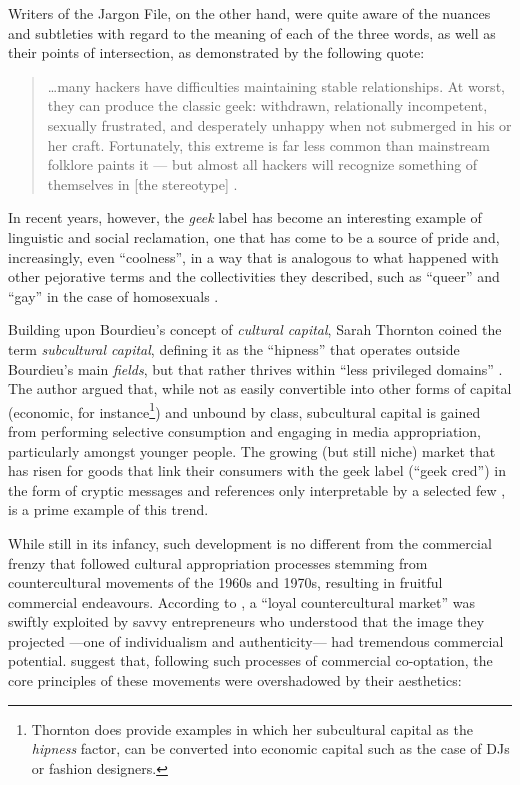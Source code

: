 Writers of the Jargon File, on the other hand, were quite aware of the nuances and subtleties with regard to the meaning of each of the three words, as well as their points of intersection, as demonstrated by the following quote:

\begin{quote}
\ldots many hackers have difficulties maintaining stable relationships. At worst, they can produce the classic geek: withdrawn, relationally incompetent, sexually frustrated, and desperately unhappy when not submerged in his or her craft. Fortunately, this extreme is far less common than mainstream folklore paints it — but almost all hackers will recognize something of themselves in [the stereotype] \citep[p.744]{raymond93}.
\end{quote}

In recent years, however, the \textit{geek} label has become an interesting example of linguistic and social reclamation, one that has come to be a source of pride and, increasingly, even ``coolness'', in a way that is analogous to what happened with other pejorative terms and the collectivities they described, such as ``queer'' and ``gay'' in the case of homosexuals \citep{brontsema04}.

Building upon Bourdieu's concept of \textit{cultural capital}, Sarah Thornton \citeyearpar{thornton96} coined the term \textit{subcultural capital}, defining it as the ``hipness'' that operates outside Bourdieu's main \textit{fields}, but that rather thrives within ``less privileged domains'' \citep[p. 11--14]{thornton96}. The author argued that, while not as easily convertible into other forms of capital (economic, for instance\footnote{Thornton does provide examples in which her subcultural capital as the \textit{hipness} factor, can be converted into economic capital such as the case of DJs or fashion designers.}) and unbound by class, subcultural capital is gained from performing selective consumption and engaging in media appropriation, particularly amongst younger people. The growing (but still niche) market that has risen for goods that link their consumers with the geek label (``geek cred'') in the form of cryptic messages and references only interpretable by a selected few \citep{tocci07}, is a prime example of this trend.

While still in its infancy, such development is no different from the commercial frenzy that followed cultural appropriation processes stemming from countercultural movements of the 1960s and 1970s, resulting in fruitful commercial endeavours. According to \citet[p.91]{moore07}, a ``loyal countercultural market'' was swiftly exploited by savvy entrepreneurs who understood that the image they projected ---one of individualism and au\-then\-ticity--- had tremendous commercial potential. \citet{heath05} suggest that, following such processes of commercial co-optation, the core principles of these movements were overshadowed by their aesthetics:


